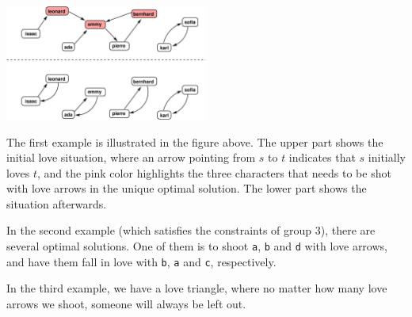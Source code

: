 \section*{\sampleexplanations}

\begin{center}
\includegraphics[width=0.5\textwidth]{polygonfig.pdf}
\end{center}

The first example is illustrated in the figure above. The upper part shows the initial love situation, where an arrow pointing from $s$ to $t$ indicates that $s$ initially loves $t$, and the pink color highlights the three characters that needs to be shot with love arrows in the unique optimal solution. The lower part shows the situation afterwards.

In the second example (which satisfies the constraints of group 3), there are several optimal solutions.
One of them is to shoot \texttt{a}, \texttt{b} and \texttt{d} with love arrows, and have them fall in love with \texttt{b}, \texttt{a} and \texttt{c}, respectively.

In the third example, we have a love triangle, where no matter how many love arrows we shoot, someone will always be left out.
